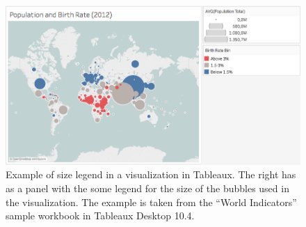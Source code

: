 \begin{figure}[h]
	\centering
	\includegraphics[width=0.95\columnwidth]{figures/size-legend}
	\caption{Example of size legend in a visualization in Tableaux. The right has as a panel with the some legend for the size of the bubbles used in the visualization. The example is taken from the ``World Indicators'' sample workbook in Tableaux Desktop 10.4.}
	\label{fig:size-legend}
\end{figure}

